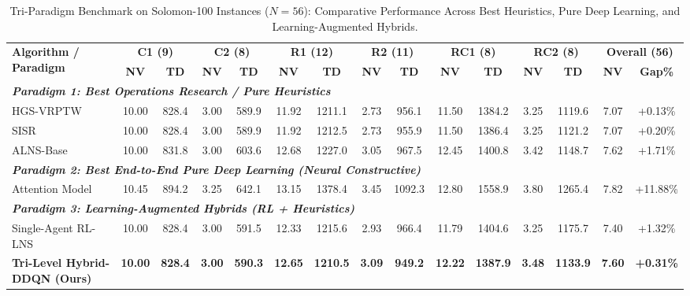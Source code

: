 \documentclass{ieeeaccess}
\begin{document}
\begin{table}[!t]
\caption{Tri-Paradigm Benchmark on Solomon-100 Instances ($N=56$): Comparative Performance Across Best Heuristics, Pure Deep Learning, and Learning-Augmented Hybrids.}
\label{tab:solomon_tri_paradigm}
\centering
\footnotesize
\setlength{\tabcolsep}{3.8pt}
\begin{tabular*}{\textwidth}{@{\extracolsep{\fill}} l cc cc cc cc cc cc cc @{}}
\toprule
\multirow{2}{*}{\textbf{Algorithm / Paradigm}} & \multicolumn{2}{c}{\textbf{C1 (9)}} & \multicolumn{2}{c}{\textbf{C2 (8)}} & \multicolumn{2}{c}{\textbf{R1 (12)}} & \multicolumn{2}{c}{\textbf{R2 (11)}} & \multicolumn{2}{c}{\textbf{RC1 (8)}} & \multicolumn{2}{c}{\textbf{RC2 (8)}} & \multicolumn{2}{c}{\textbf{Overall (56)}} \\
\cmidrule(lr){2-3} \cmidrule(lr){4-5} \cmidrule(lr){6-7} \cmidrule(lr){8-9} \cmidrule(lr){10-11} \cmidrule(lr){12-13} \cmidrule(lr){14-15}
 & \textbf{NV} & \textbf{TD} & \textbf{NV} & \textbf{TD} & \textbf{NV} & \textbf{TD} & \textbf{NV} & \textbf{TD} & \textbf{NV} & \textbf{TD} & \textbf{NV} & \textbf{TD} & \textbf{NV} & \textbf{Gap\%} \\
\midrule
\multicolumn{15}{l}{\textit{\textbf{Paradigm 1: Best Operations Research / Pure Heuristics}}} \\
HGS-VRPTW \cite{vidal2013hybrid} & 10.00 & 828.4 & 3.00 & 589.9 & 11.92 & 1211.1 & 2.73 & 956.1 & 11.50 & 1384.2 & 3.25 & 1119.6 & 7.07 & +0.13\% \\
SISR \cite{christiaens2020slack} & 10.00 & 828.4 & 3.00 & 589.9 & 11.92 & 1212.5 & 2.73 & 955.9 & 11.50 & 1386.4 & 3.25 & 1121.2 & 7.07 & +0.20\% \\
ALNS-Base \cite{Ropke2006} & 10.00 & 831.8 & 3.00 & 603.6 & 12.68 & 1227.0 & 3.05 & 967.5 & 12.45 & 1400.8 & 3.42 & 1148.7 & 7.62 & +1.71\% \\
\midrule
\multicolumn{15}{l}{\textit{\textbf{Paradigm 2: Best End-to-End Pure Deep Learning (Neural Constructive)}}} \\
Attention Model \cite{kool2019attention,lin2021neural} & 10.45 & 894.2 & 3.25 & 642.1 & 13.15 & 1378.4 & 3.45 & 1092.3 & 12.80 & 1558.9 & 3.80 & 1265.4 & 7.82 & +11.88\% \\
\midrule
\multicolumn{15}{l}{\textit{\textbf{Paradigm 3: Learning-Augmented Hybrids (RL + Heuristics)}}} \\
Single-Agent RL-LNS \cite{lu2020learning,son2023learning} & 10.00 & 828.4 & 3.00 & 591.5 & 12.33 & 1215.6 & 2.93 & 966.4 & 11.79 & 1404.6 & 3.25 & 1175.7 & 7.40 & +1.32\% \\
\textbf{Tri-Level Hybrid-DDQN (Ours)} & \textbf{10.00} & \textbf{828.4} & \textbf{3.00} & \textbf{590.3} & \textbf{12.65} & \textbf{1210.5} & \textbf{3.09} & \textbf{949.2} & \textbf{12.22} & \textbf{1387.9} & \textbf{3.48} & \textbf{1133.9} & \textbf{7.60} & \textbf{+0.31\%} \\
\bottomrule
\end{tabular*}
\end{table}
\end{document}
